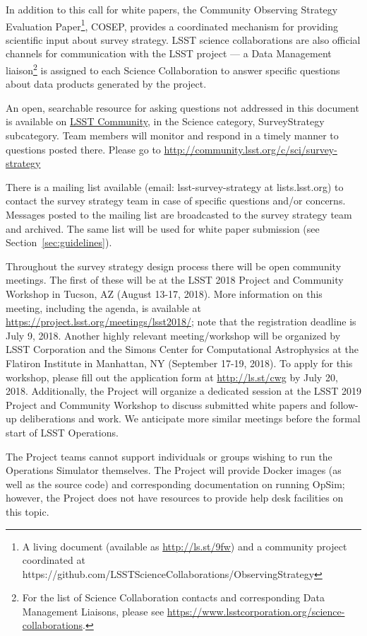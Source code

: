 \documentclass[DM,toc,usenatbib]{lsstdoc}
\begin{document}
In addition to this call for white papers, the Community Observing Strategy Evaluation Paper\footnote{A living document (available
as \url{http://ls.st/9fw}) and a community project coordinated at https://github.com/LSSTScienceCollaborations/ObservingStrategy}, COSEP, provides a coordinated mechanism for providing scientific input about survey strategy. LSST science collaborations are also official channels for communication with the LSST project --- a Data Management 
liaison\footnote{For the list of Science Collaboration contacts and corresponding Data Management Liaisons, please see \url{https://www.lsstcorporation.org/science-collaborations}.}  is assigned to each Science Collaboration to answer specific questions about data products generated by the project.

An open, searchable resource for asking questions not addressed in this document is available on \href{http://community.lsst.org}{LSST Community}, in the Science category, SurveyStrategy subcategory. Team members will monitor and respond in a timely manner to questions posted there. Please go to \url{http://community.lsst.org/c/sci/survey-strategy}

There is a mailing list available (email: lsst-survey-strategy at lists.lsst.org) to contact the survey strategy team in case of specific 
questions and/or concerns. Messages posted to the mailing list are broadcasted to the survey strategy team and archived. 
The same list will be used for white paper submission (see Section~\ref{sec:guidelines}). 

Throughout the survey strategy design process there will be open community meetings. The first of these will be 
at the LSST 2018 Project and Community Workshop in Tucson, AZ (August 13-17, 2018). More information on this 
meeting, including the agenda, is available at \url{https://project.lsst.org/meetings/lsst2018/}; note that the registration
deadline is July 9, 2018. Another highly relevant
meeting/workshop will be organized by LSST Corporation and the Simons Center for Computational Astrophysics
at the Flatiron Institute in Manhattan, NY (September 17-19, 2018). To apply for this workshop, please fill out the 
application form at \url{http://ls.st/cwg} by July 20, 2018. Additionally, the Project will organize a dedicated session at the
LSST 2019 Project and Community Workshop to discuss submitted white papers and follow-up
deliberations and work. We anticipate more similar meetings before the formal start of LSST Operations. 

The Project teams cannot support individuals or groups wishing to run the Operations Simulator themselves. 
The Project will provide Docker images (as well as the source code) and corresponding documentation on running 
OpSim; however, the Project does not have resources to provide help desk facilities on this topic. 
\end{document}
